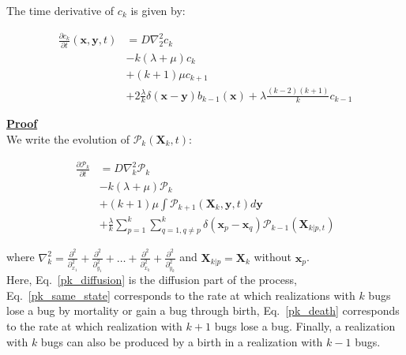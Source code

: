 The time derivative of $c_k$ is given by:

\begin{subequations} 
\begin{align}
\frac{\partial c_{k}}{\partial t}(\boldsymbol{x},\boldsymbol{y},t) & =D\nabla_{2}^{2}c_{k}\label{ck_diffusion-1}\\
 & -k(\lambda+\mu)c_{k}\label{ck_same_state-1}\\
 & +(k+1)\mu c_{k+1}\label{ck_death-1}\\
 & +2\frac{\lambda}{k}\delta(\boldsymbol{x}-\boldsymbol{y})b_{k-1}(\boldsymbol{x})+\lambda\frac{(k-2)(k+1)}{k}c_{k-1}\label{ck_birth-1}
\end{align}
\end{subequations}

\newpage

\textbf{\underline{Proof}}\\

We write the evolution of $\mathcal{P}_{k}(\boldsymbol{X}_{k},t)$:

\begin{subequations} 
\begin{align}
\frac{\partial\mathcal{P}_{k}}{\partial t} & =D\nabla_{k}^{2}\mathcal{P}_{k}\label{pk_diffusion}\\
 & -k(\lambda+\mu)\mathcal{P}_{k}\label{pk_same_state}\\
 & +(k+1)\mu\int\mathcal{P}_{k+1}(\boldsymbol{X}_{k},\boldsymbol{y},t)d\boldsymbol{y}\label{pk_death}\\
 & +\frac{\lambda}{k}\sum_{p=1}^{k}\sum_{q=1,q\neq p}^{k}\delta({\boldsymbol{x}_p-\boldsymbol{x}_q})\mathcal{P}_{k-1}(\boldsymbol{X}_{k|p,t})\label{pk_birth}
\end{align}
\end{subequations}

where $\nabla_{k}^{2}=\frac{\partial^{2}}{\partial_{x_{1}}^{2}}+\frac{\partial^{2}}{\partial_{y_{1}}^{2}}+\ldots+\frac{\partial^{2}}{\partial_{x_{k}}^{2}}+\frac{\partial^{2}}{\partial_{y_{k}}^{2}}$ and $\boldsymbol{X}_{k|p}=\boldsymbol{X}_{k}$
without $\boldsymbol{x}_{p}$. \\

Here, Eq.~\ref{pk_diffusion} is the diffusion part of the process, 
Eq.~\ref{pk_same_state} corresponds to the rate at which realizations with $k$ bugs lose a bug by mortality or gain a bug through birth,  Eq.~\ref{pk_death} corresponds to the rate at which realization with $k+1$ bugs lose a bug. Finally, a realization with $k$ bugs can also be produced by a birth in a realization with $k-1$ bugs. \\

